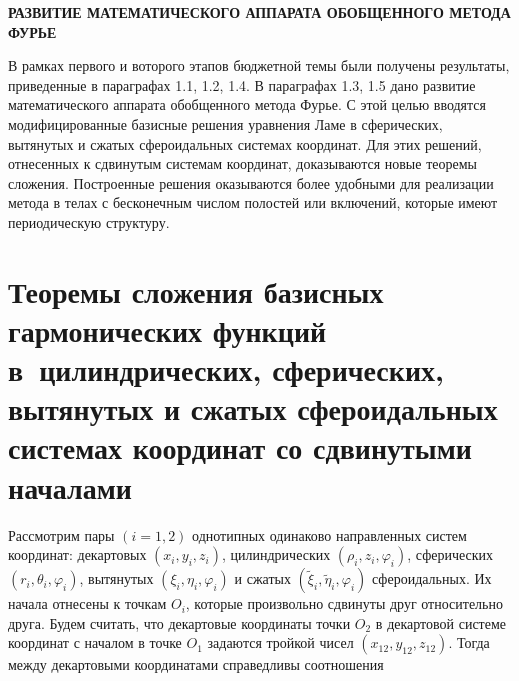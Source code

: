 
\begin{center}
{\normalsize\textbf{\centering\thechapter\; РАЗВИТИЕ МАТЕМАТИЧЕСКОГО АППАРАТА ОБОБЩЕННОГО МЕТОДА ФУРЬЕ}}\vspace{14pt} 
\end{center}



В рамках первого и воторого этапов бюджетной темы были получены результаты, приведенные в параграфах 1.1, 1.2, 1.4. В параграфах 1.3, 1.5 дано развитие математического аппарата обобщенного метода Фурье. С этой целью вводятся модифицированные базисные решения уравнения Ламе в сферических, вытянутых и сжатых сфероидальных системах координат. Для этих решений, отнесенных к сдвинутым системам координат, доказываются новые теоремы сложения. Построенные решения оказываются более удобными для реализации метода в телах с бесконечным числом полостей или включений, которые имеют периодическую структуру. 

\section[Теоремы сложения базисных гармонических функций в ци\-линд\-ри\-че\-ских, сферических, вытянутых и сжатых сфероидальных сис\-те\-мах координат со сдвинутыми началами]{Теоремы сложения базисных гармонических функций в~цилиндрических, сферических, вытянутых и сжатых сфероидальных системах координат со сдвинутыми началами}

Рассмотрим пары $(i = 1,2)$ однотипных одинаково направленных систем координат: декартовых $\left( {{x_i},{y_i},{z_i}} \right)$, цилиндрических $\left( {{\rho _i},{z_i},{\varphi _i}} \right)$, сферических $\left( {{r_i},{\theta _i},{\varphi _i}} \right)$, вытянутых $\left( {{\xi _i},{\eta _i},{\varphi _i}} \right)$ и сжатых $\left( {{{\tilde \xi }_i},{{\tilde \eta }_i},{\varphi _i}} \right)$ сфероидальных. Их начала отнесены к точкам ${O_i}$, которые произвольно сдвинуты друг относительно друга. Будем считать, что декартовые координаты точки ${O_2}$ в декартовой системе координат с началом в точке ${O_1}$ задаются тройкой чисел $\left( {{x_{12}},{y_{12}},{z_{12}}} \right)$. Тогда между декартовыми координатами справедливы соотношения\sloppy

